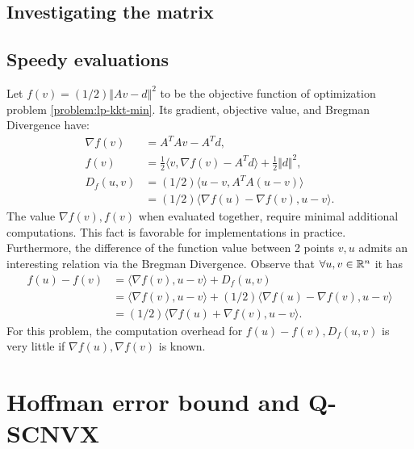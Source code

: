 \documentclass[12pt]{report}
\begin{document}
        \subsection{Investigating the matrix}
            
        \subsection{Speedy evaluations}
            Let $f(v) = (1/2)\Vert Av - d\Vert^2$ to be the objective function of optimization problem \eqref{problem:lp-kkt-min}. 
            Its gradient, objective value, and Bregman Divergence have: 
            \begin{align*}
                \nabla f(v) &= A^TAv - A^Td, 
                \\
                f(v) &= 
                \frac{1}{2}\langle v, \nabla f(v) - A^Td\rangle + \frac{1}{2}\Vert d\Vert^2, 
                \\
                D_f(u, v) &= (1/2)\langle u - v, A^TA (u - v)\rangle
                \\
                &= (1/2)\langle \nabla f(u) - \nabla f(v), u - v\rangle. 
            \end{align*}
            The value $\nabla f(v), f(v)$ when evaluated together, require minimal additional computations. 
            This fact is favorable for implementations in practice. 
            Furthermore, the difference of the function value between 2 points $v, u$ admits an interesting relation via the Bregman Divergence. 
            Observe that $\forall u, v \in \mathbb R^n$ it has 
            \begin{align*}
                f(u) - f(v) &= \langle \nabla f(v), u - v \rangle + D_f(u, v)
                \\
                &= \langle \nabla f(v), u - v \rangle + (1/2)\langle \nabla f(u) - \nabla f(v), u - v\rangle
                \\
                &= (1/2)\langle \nabla f(u) + \nabla f(v), u - v\rangle. 
            \end{align*}
            For this problem, the computation overhead for $f(u) - f(v), D_f(u, v)$ is very little if $\nabla f(u), \nabla f(v)$ is known. 
    \section{Hoffman error bound and Q-SCNVX}
\end{document}
